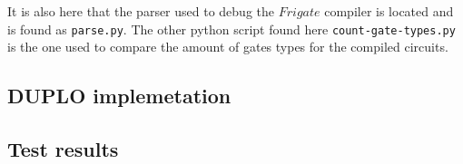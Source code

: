 \documentclass[twoside,11pt,openright]{report}
\begin{document}
\begin{appendices}
\bigskip

It is also here that the parser used to debug the $Frigate$ compiler is located and is found as \verb|parse.py|. The other python script found here \verb|count-gate-types.py| is the one used to compare the amount of gates types for the compiled circuits.


\subsection{DUPLO implemetation}
\label{app:duplo-impl}


\subsection{Test results}
\label{app:test-res}


\end{appendices}



%
%
\end{document}
